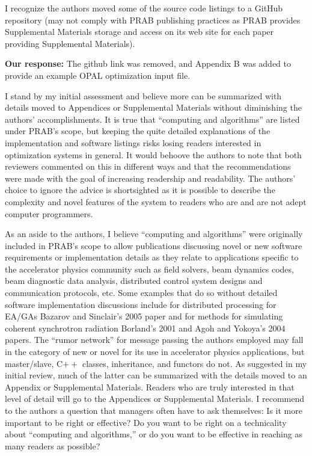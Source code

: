 \documentclass{article}
\begin{document}
I recognize the authors moved some of the source code listings to a
GitHub repository (may not comply with PRAB publishing practices as
PRAB provides Supplemental Materials storage and access on its web
site for each paper providing Supplemental Materials). 

{\bf Our response:} {\color{blue} The github link was removed,
	and Appendix B was added to provide an example OPAL 
	optimization input file.}



I stand by my initial assessment and believe more can be summarized with details
moved to Appendices or Supplemental Materials without diminishing the
authors' accomplishments. It is true that ``computing and algorithms''
are listed under PRAB's scope, but keeping the quite detailed
explanations of the implementation and software listings risks losing
readers interested in optimization systems in general. It would
behoove the authors to note that both reviewers commented on this in
different ways and that the recommendations were made with the goal of
increasing readership and readability. The authors' choice to ignore
the advice is shortsighted as it is possible to describe the
complexity and novel features of the system to readers who are and are
not adept computer programmers.

As an aside to the authors, I believe ``computing and algorithms''
were originally included in PRAB's scope to allow publications
discussing novel or new software requirements or
implementation details as they relate to applications specific to the
accelerator physics community such as field solvers, beam dynamics
codes, beam diagnostic data analysis, distributed control system
designs and communication protocols, etc. Some examples that do so
without detailed software implementation discussions include for
distributed processing for EA/GAs Bazarov and Sinclair's 2005 paper
and for methods for simulating coherent synchrotron radiation
Borland's 2001 and Agoh and Yokoya's 2004 papers. The ``rumor
network'' for message passing the authors employed may fall in the
category of new or novel for its use in accelerator physics
applications, but master/slave, C$++$ classes, inheritance, and
functors do not. As suggested in my initial review, much of the latter
can be summarized with the details moved to an Appendix or
Supplemental Materials. Readers who are truly interested in that level
of detail will go to the Appendices or Supplemental Materials. I
recommend to the authors a question that managers often have to ask
themselves: Is it more important to be right or effective? Do you want
to be right on a technicality about ``computing and algorithms,'' or
do you want to be effective in reaching as many readers as possible?
\end{document}
